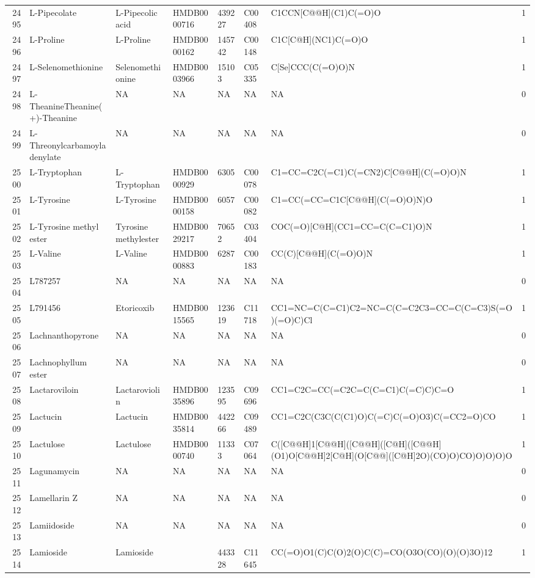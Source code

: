 \documentclass[a4paper]{article}
\begin{document}
\begin{longtable}{rlllllll}
  2495 & L-Pipecolate & L-Pipecolic acid & HMDB0000716 & 439227 & C00408 & C1CCN[C@@H](C1)C(=O)O & 1 \\ 
  2496 & L-Proline & L-Proline & HMDB0000162 & 145742 & C00148 & C1C[C@H](NC1)C(=O)O & 1 \\ 
  2497 & L-Selenomethionine & Selenomethionine & HMDB0003966 & 15103 & C05335 & C[Se]CCC(C(=O)O)N & 1 \\ 
  2498 & L-TheanineTheanine(+)-Theanine & NA & NA & NA & NA & NA & 0 \\ 
  2499 & L-Threonylcarbamoyladenylate & NA & NA & NA & NA & NA & 0 \\ 
  2500 & L-Tryptophan & L-Tryptophan & HMDB0000929 & 6305 & C00078 & C1=CC=C2C(=C1)C(=CN2)C[C@@H](C(=O)O)N & 1 \\ 
  2501 & L-Tyrosine & L-Tyrosine & HMDB0000158 & 6057 & C00082 & C1=CC(=CC=C1C[C@@H](C(=O)O)N)O & 1 \\ 
  2502 & L-Tyrosine methyl ester & Tyrosine methylester & HMDB0029217 & 70652 & C03404 & COC(=O)[C@H](CC1=CC=C(C=C1)O)N & 1 \\ 
  2503 & L-Valine & L-Valine & HMDB0000883 & 6287 & C00183 & CC(C)[C@@H](C(=O)O)N & 1 \\ 
  2504 & L787257 & NA & NA & NA & NA & NA & 0 \\ 
  2505 & L791456 & Etoricoxib & HMDB0015565 & 123619 & C11718 & CC1=NC=C(C=C1)C2=NC=C(C=C2C3=CC=C(C=C3)S(=O)(=O)C)Cl & 1 \\ 
  2506 & Lachnanthopyrone & NA & NA & NA & NA & NA & 0 \\ 
  2507 & Lachnophyllum ester & NA & NA & NA & NA & NA & 0 \\ 
  2508 & Lactaroviloin & Lactaroviolin & HMDB0035896 & 123595 & C09696 & CC1=C2C=CC(=C2C=C(C=C1)C(=C)C)C=O & 1 \\ 
  2509 & Lactucin & Lactucin & HMDB0035814 & 442266 & C09489 & CC1=C2C(C3C(C(C1)O)C(=C)C(=O)O3)C(=CC2=O)CO & 1 \\ 
  2510 & Lactulose & Lactulose & HMDB0000740 & 11333 & C07064 & C([C@@H]1[C@@H]([C@@H]([C@H]([C@@H](O1)O[C@@H]2[C@H](O[C@@]([C@H]2O)(CO)O)CO)O)O)O)O & 1 \\ 
  2511 & Lagunamycin & NA & NA & NA & NA & NA & 0 \\ 
  2512 & Lamellarin Z & NA & NA & NA & NA & NA & 0 \\ 
  2513 & Lamiidoside & NA & NA & NA & NA & NA & 0 \\ 
  2514 & Lamioside & Lamioside &  & 443328 & C11645 & CC(=O)O1(C)C(O)2(O)C(C)=CO(O3O(CO)(O)(O)3O)12 & 1 \\ 

\end{longtable}
\end{document}
